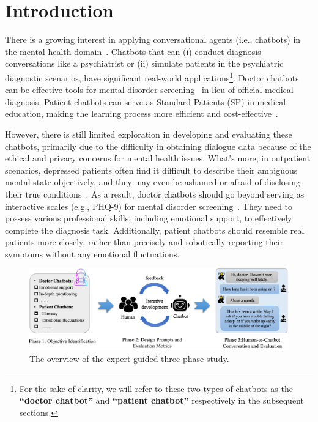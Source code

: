\section{Introduction}
\label{sec:intro}

There is a growing interest in applying conversational agents (i.e., chatbots) in the mental health domain~\cite{sabour2022chatbots}. Chatbots that can (i) conduct diagnosis conversations like a psychiatrist or (ii) simulate patients in the psychiatric diagnostic scenarios, have significant real-world applications\footnote{For the sake of clarity, we will refer to these two types of chatbots as the \textbf{``doctor chatbot''} and \textbf{``patient chatbot''} respectively in the subsequent sections.}. 
Doctor chatbots can be effective tools for mental disorder screening~\cite{pacheco2021Smart} in lieu of official medical diagnosis. Patient chatbots can serve as Standard Patients (SP) in medical education, making the learning process more efficient and cost-effective~\cite{Torous2021growing}.

However, there is still limited exploration in developing and evaluating these 
chatbots, primarily due to the difficulty in obtaining dialogue data because 
of the ethical and privacy concerns for mental health issues. 
What's more, in outpatient scenarios, depressed patients often find it difficult 
to describe their ambiguous mental state objectively, 
and they may even be ashamed or afraid of disclosing their true 
conditions~\cite{Salaheddine2016Identify}. As a result, doctor chatbots should 
go beyond serving as interactive scales (e.g., PHQ-9) for mental disorder 
screening~\cite{Yue2023Beyond}. They need to possess various professional 
skills, including emotional support, to effectively complete the diagnosis task.
Additionally, patient chatbots should resemble real patients more closely, 
rather than precisely and robotically reporting their symptoms without 
any emotional fluctuations.

\begin{figure}[th]
	\centering
	\includegraphics[width=0.8\linewidth]{Figures/overview.png}
	\caption{The overview of the expert-guided three-phase study.}
	\label{fig:pipeline}
\end{figure}

